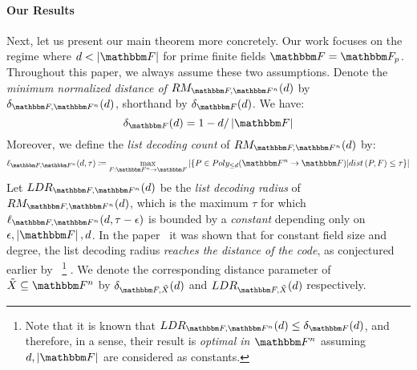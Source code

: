 \paragraph{Our Results}
Next, let us present our main theorem more concretely.
Our work focuses on the regime where $\degree < \abs{\basefield}$ for prime finite fields $\basefield = \basefield_p$.
Throughout this paper, we always assume these two assumptions.
Denote the \emph{minimum normalized distance of $\reedmullercodeex{\basefield}{\field}{\degree}$} by $\normalizedcodedistanceex{\basefield}{\field}{\degree}$,
shorthand by $\normalizedcodedistance{\basefield}{\degree}$.
We have:
\[
    \normalizedcodedistance{\basefield}{\degree} = 1 - \degree/\abs{\basefield}
\]
Moreover, we define the \emph{list decoding count} of $\reedmullercodeex{\basefield}{\field}{\degree}$ by:
\[
    \listpolycount{\basefield}{\field}{\degree}{\tau} \definedas
    \max_{\funcdef{\genfunc}{\field}{\basefield}}
        {\abs{\set{\genpoly \in \allpolyset{\leq \degree}{\field}{\basefield} \suchthat {\dist{\genpoly, \genfunc} \leq \tau}}}}
\]
Let $\listdecodingradiusex{\basefield}{\field}{\degree}$ be the \emph{list decoding radius} of $\reedmullercodeex{\basefield}{\field}{\degree}$,
which is the maximum $\tau$ for which $\listpolycount{\basefield}{\field}{\degree}{\tau - \epsilon}$ is bounded by a \emph{constant} depending only on $\epsilon, \abs{\basefield}, \degree$.
\newline
In the paper~\cite{bhowmick2014list} it was shown that for constant field size and degree, the list decoding radius \emph{reaches the distance of the code}, as conjectured earlier by~\cite{10.1145/1374376.1374417}
\footnote{Note that it is known that $\listdecodingradiusex{\basefield}{\field}{\degree} \leq \normalizedcodedistance{\basefield}{\degree}$,
    and therefore, in a sense, their result is \emph{optimal in $\field$} assuming $\degree, \abs{\basefield}$ are considered as constants.}
.
We denote the corresponding distance parameter of $\variety \subseteq \field$ by $\normalizedcodedistanceex{\basefield}{\variety}{\degree}$ and $\listdecodingradiusex{\basefield}{\variety}{\degree}$ respectively.


